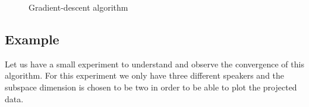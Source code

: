 \documentclass{techrep} %
\begin{document}
\begin{figure}[H]
  \begin{lstlisting}[frame=single]
  \end{lstlisting}
  \caption{Gradient-descent algorithm}
  \label{viter}
\end{figure}


\subsection{Example}

Let us have a small experiment to understand and observe the
convergence of this algorithm.  For this experiment we only have three
different speakers and the subspace dimension is chosen to be two in order
to be able to plot the projected data.
\end{document}
